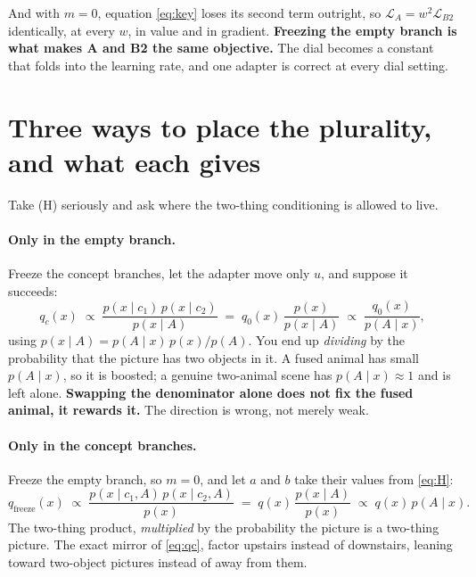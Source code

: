 \documentclass[11pt]{article}
\begin{document}
And with $m = 0$, equation \eqref{eq:key} loses its second term outright, so
$\mathcal{L}_A = w^2 \mathcal{L}_{B2}$ identically, at every $w$, in value and in gradient.
\textbf{Freezing the empty branch is what makes A and B2 the same objective.} The dial becomes a
constant that folds into the learning rate, and one adapter is correct at every dial setting.

\section{Three ways to place the plurality, and what each gives}
\label{sec:three}

Take (H) seriously and ask where the two-thing conditioning is allowed to live.

\paragraph{Only in the empty branch.}
Freeze the concept branches, let the adapter move only $u$, and suppose it succeeds:
\begin{equation}
  q_c(x) \;\propto\; \frac{p(x\mid c_1)\,p(x\mid c_2)}{p(x\mid A)}
  \;=\; q_0(x)\,\frac{p(x)}{p(x\mid A)}
  \;\propto\; \frac{q_0(x)}{p(A\mid x)} ,
  \label{eq:qc}
\end{equation}
using $p(x\mid A) = p(A\mid x)\,p(x)/p(A)$. You end up \emph{dividing} by the probability that the
picture has two objects in it. A fused animal has small $p(A\mid x)$, so it is boosted; a genuine
two-animal scene has $p(A\mid x)\approx 1$ and is left alone. \textbf{Swapping the denominator alone
does not fix the fused animal, it rewards it.} The direction is wrong, not merely weak.

\paragraph{Only in the concept branches.}
Freeze the empty branch, so $m=0$, and let $a$ and $b$ take their values from \eqref{eq:H}:
\begin{equation}
  q_{\mathrm{freeze}}(x) \;\propto\;
  \frac{p(x\mid c_1,A)\,p(x\mid c_2,A)}{p(x)}
  \;=\; q(x)\,\frac{p(x\mid A)}{p(x)}
  \;\propto\; q(x)\,p(A\mid x) .
  \label{eq:qfreeze}
\end{equation}
The two-thing product, \emph{multiplied} by the probability the picture is a two-thing picture. The
exact mirror of \eqref{eq:qc}, factor upstairs instead of downstairs, leaning toward two-object
pictures instead of away from them.
\end{document}
